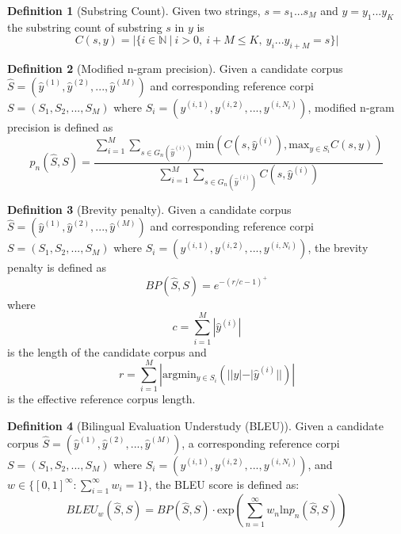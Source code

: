 \documentclass[11pt]{article}
\theoremstyle{definition}
\newtheorem{definition}{Definition}[section]
\begin{document}
\begin{definition}[Substring Count] Given two strings, $s = s_1...s_M$ and $y = y_1...y_K$ the substring count of substring $s$ in $y$ is
\begin{equation}
C(s,y) = | \{i \in \mathbb{N} \ | \ i > 0, \ i+M \leq K, \ y_i...y_{i+M} = s \} |
\end{equation}  
\end{definition}

\begin{definition}[Modified n-gram precision] Given a candidate corpus $\hat{S} = (\hat{y}^{(1)}, \hat{y}^{(2)}, ..., \hat{y}^{(M)})$ and corresponding reference corpi $S = (S_1, S_2, ..., S_M)$ where $S_i = (y^{(i,1)}, y^{(i,2)}, ..., y^{(i,N_i)})$, modified n-gram precision is defined as
\begin{equation}
p_n(\hat{S} , S) = \frac{\sum_{i=1}^M \sum_{s \in G_n(\hat{y}^{(i)})} \mathrm{min} (C(s, \hat{y}^{(i)}), \mathrm{max}_{y \in S_i} C(s,y))}{\sum_{i=1}^M \sum_{s \in G_n(\hat{y}^{(i)})} C(s, \hat{y}^{(i)})}
\end{equation}
\end{definition}

\begin{definition}[Brevity penalty] Given a candidate corpus $\hat{S} = (\hat{y}^{(1)}, \hat{y}^{(2)}, ..., \hat{y}^{(M)})$ and corresponding reference corpi $S = (S_1, S_2, ..., S_M)$ where $S_i = (y^{(i,1)}, y^{(i,2)}, ..., y^{(i,N_i)})$, the brevity penalty is defined as
\begin{equation}
BP(\hat{S}, S) = e^{-(r/c-1)^+}
\end{equation}
where
\begin{equation}
c = \sum_{i=1}^M | \hat{y}^{(i)} |
\end{equation}
is the length of the candidate corpus and
\begin{equation}
r = \sum_{i=1}^M | \mathrm{arg} \mathrm{min}_{y \in S_i} \left( | |y| - |\hat{y}^{(i)}| | \right) |
\end{equation}
is the effective reference corpus length.
\end{definition}

\begin{definition}[Bilingual Evaluation Understudy (BLEU)] Given a candidate corpus $\hat{S} = (\hat{y}^{(1)}, \hat{y}^{(2)}, ..., \hat{y}^{(M)})$, a corresponding reference corpi $S = (S_1, S_2, ..., S_M)$ where $S_i = (y^{(i,1)}, y^{(i,2)}, ..., y^{(i,N_i)})$, and $w \in \{ \left[ 0, 1\right]^{\infty} : \sum_{i=1}^{\infty} w_i = 1 \}$, the BLEU score is defined as:
\begin{equation}
BLEU_w (\hat{S}, S) = BP (\hat{S}, S) \cdot \mathrm{exp} \left( \sum_{n=1}^{\infty} w_n \mathrm{ln} p_n ( \hat{S} , S) \right)
\end{equation}
\end{definition}
\end{document}
